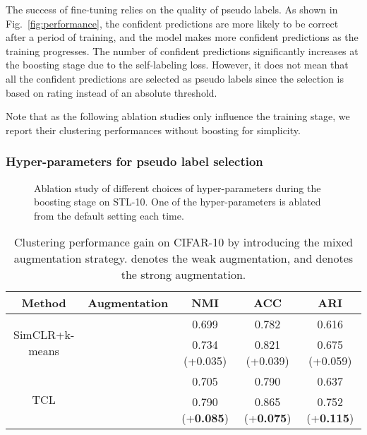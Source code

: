 The success of fine-tuning relies on the quality of pseudo labels. As shown in Fig.~\ref{fig:performance}, the confident predictions are more likely to be correct after a period of training, and the model makes more confident predictions as the training progresses. The number of confident predictions significantly increases at the boosting stage due to the self-labeling loss. However, it does not mean that all the confident predictions are selected as pseudo labels since the selection is based on rating instead of an absolute threshold.

Note that as the following ablation studies only influence the training stage, we report their clustering performances without boosting for simplicity.

\subsubsection{Hyper-parameters for pseudo label selection}
\label{sec:hyper-params}

\begin{figure*}[!t]\centering
  \caption{Ablation study of different choices of hyper-parameters during the boosting stage on STL-10. One of the hyper-parameters is ablated from the default setting  each time.}\label{fig:pseudo}
\end{figure*}

\begin{table*}[!t]
\centering
\caption{Clustering performance gain on CIFAR-10 by introducing the mixed augmentation strategy.  denotes the weak augmentation, and  denotes the strong augmentation.}
\label{tab:gain}
\begin{tabular}{@{}ccccc@{}}
\toprule
Method                          & Augmentation & NMI   & ACC   & ARI     \\ \midrule
\multirow{2}{*}{SimCLR+k-means}  &              & 0.699 & 0.782 & 0.616      \\
                             &              & 0.734 (+0.035) & 0.821 (+0.039) & 0.675 (+0.059)  \\ \midrule
\multirow{2}{*}{TCL}            &              & 0.705 & 0.790 & 0.637    \\
                                &              & 0.790 (+\textbf{0.085}) & 0.865 (+\textbf{0.075}) & 0.752 (+\textbf{0.115}) \\ \bottomrule
\end{tabular}
\end{table*}

